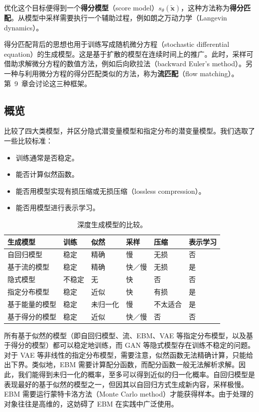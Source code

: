 优化这个目标便得到一个\textbf{得分模型}（score model）$s_\theta(\tilde{\mathbf{x}})$，这种方法称为\textbf{得分匹配}。从模型中采样需要执行一个辅助过程，例如朗之万动力学（Langevin dynamics）。

得分匹配背后的思想也用于训练写成随机微分方程（stochastic differential equation）的生成模型。这是基于扩散的模型在连续时间上的推广。此时，采样可借助求解微分方程的数值方法，例如后向欧拉法（backward Euler's method）。另一种与利用微分方程的得分匹配类似的方法，称为\textbf{流匹配}（flow matching）。第~9~章会讨论这三种框架。

\subsection{概览}
比较了四大类模型，并区分隐式潜变量模型和指定分布的潜变量模型。我们选取了一些比较标准：
\begin{itemize}
\item 训练通常是否稳定。
\item 能否计算似然函数。
\item 能否用模型实现有损压缩或无损压缩（lossless compression）。
\item 能否用模型进行表示学习。
\end{itemize}

\begin{table}[tbp]
\caption{深度生成模型的比较。}\label{tab:01-01}
\centering\footnotesize
\begin{tabularx}{\linewidth}{@{}L{7.5em}llllY@{}}
\toprule
生成模型 & 训练 & 似然 & 采样 & 压缩 & 表示学习\\
\midrule
自回归模型 & 稳定 & 精确 & 慢 & 无损 & 否\\
基于流的模型 & 稳定 & 精确 & 快／慢 & 无损 & 是\\
隐式模型 & 不稳定 & 无 & 快 & 否 & 否\\
指定分布模型 & 稳定 & 近似 & 快 & 有损 & 是\\
基于能量的模型 & 稳定 & 未归一化 & 慢 & 不太适合 & 是\\
基于得分的模型 & 稳定 & 近似 & 快／慢 & 否 & 否\\
\bottomrule
\end{tabularx}
\end{table}

所有基于似然的模型（即自回归模型、流、EBM、VAE 等指定分布模型，以及基于得分的模型）都可以稳定地训练，而 GAN 等隐式模型存在训练不稳定的问题。对于 VAE 等非线性的指定分布模型，需要注意，似然函数无法精确计算，只能给出下界。类似地，EBM 需要计算配分函数，而配分函数一般无法解析求解。因此，我们能得到未归一化的概率，至多可以得到近似的归一化概率。自回归模型是表现最好的基于似然的模型之一，但因其以自回归方式生成新内容，采样极慢。EBM 需要运行蒙特卡洛方法（Monte Carlo method）才能获得样本。由于处理的对象往往是高维的，这妨碍了 EBM 在实践中广泛使用。

